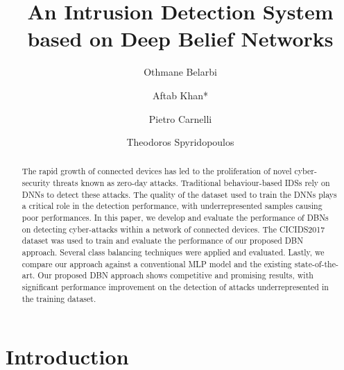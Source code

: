 \documentclass[runningheads]{llncs}
\begin{document}
\title{An Intrusion Detection System based on Deep Belief Networks}

\author{Othmane Belarbi \and Aftab Khan* \and Pietro Carnelli \and Theodoros Spyridopoulos}



\maketitle

\begin{abstract}
    The rapid growth of connected devices has led to the proliferation of novel cyber-security threats known as zero-day attacks. Traditional behaviour-based \acp{IDS} rely on \acp{DNN} to detect these attacks. The quality of the dataset used to train the \acp{DNN} plays a critical role in the detection performance, with underrepresented samples causing poor performances. In this paper, we develop and evaluate the performance of \acp{DBN} on detecting cyber-attacks within a network of connected devices. The CICIDS2017 dataset was used to train and evaluate the performance of our proposed \ac{DBN} approach. Several class balancing techniques were applied and evaluated. Lastly, we compare our approach against a conventional \ac{MLP} model and the existing state-of-the-art. Our proposed \ac{DBN} approach shows competitive and promising results, with significant performance improvement on the detection of attacks underrepresented in the training dataset.
\end{abstract}

\section{Introduction}
\label{sec:intro}
\end{document}
